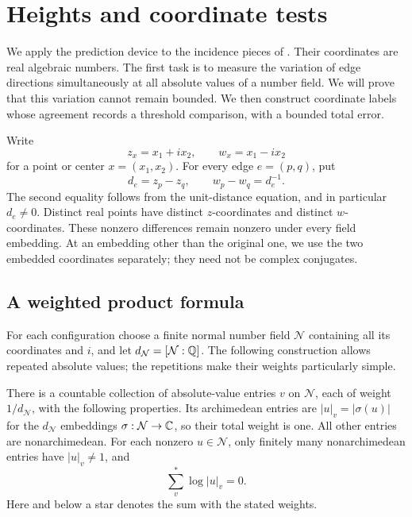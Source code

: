 \section{Heights and coordinate tests}\label{sec:heights}

We apply the prediction device to the incidence pieces of
. Their coordinates are real algebraic numbers.
The first task is to measure the variation of edge directions simultaneously
at all absolute values of a number field. We will prove that this variation
cannot remain bounded. We then construct coordinate labels whose agreement
records a threshold comparison, with a bounded total error.

Write
\[
 z_x=x_1+i x_2,\qquad w_x=x_1-i x_2
\]
for a point or center $x=(x_1,x_2)$. For every edge $e=(p,q)$, put
\begin{equation}\label{ht:jumps}
 d_e=z_p-z_q,\qquad w_p-w_q=d_e^{-1}.
\end{equation}
The second equality follows from the unit-distance equation, and in
particular $d_e\ne0$. Distinct real points have distinct $z$-coordinates and
distinct $w$-coordinates. These nonzero differences remain nonzero under
every field embedding. At an embedding other than the original one,
we use the two embedded coordinates separately; they need not be complex
conjugates.

\subsection{A weighted product formula}

For each configuration choose a finite normal number field $\mathcal N$
containing all its coordinates and $i$, and let
$d_{\mathcal N}=[\mathcal N:\mathbb Q]$.
The following construction allows repeated absolute values; the repetitions
make their weights particularly simple.

\begin{lemma}\label{ht:product}
There is a countable collection of absolute-value entries $v$ on
$\mathcal N$, each of weight $1/d_{\mathcal N}$, with the following properties.
Its archimedean entries are $|u|_v=|\sigma(u)|$ for the $d_{\mathcal N}$ embeddings
$\sigma:\mathcal N\to\mathbb C$, so their total weight is one. All other entries
are nonarchimedean. For each nonzero $u\in\mathcal N$, only finitely many
nonarchimedean entries have $|u|_v\ne1$, and
\begin{equation}\label{ht:product-formula}
 \sum_v^*\log|u|_v=0.
\end{equation}
Here and below a star denotes the sum with the stated weights.
\end{lemma}

